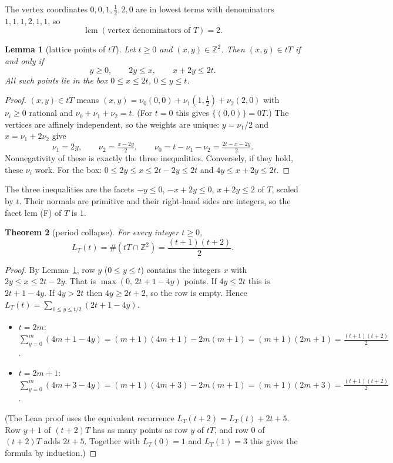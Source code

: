 \documentclass[11pt]{article}
\newtheorem{theorem}{Theorem}
\newtheorem{lemma}[theorem]{Lemma}
\theoremstyle{definition}
\theoremstyle{remark}
\newcommand{\Z}{\mathbb Z}
\newcommand{\lcm}{\operatorname{lcm}}
\begin{document}
The vertex coordinates $0,0,1,\frac12,2,0$ are in lowest terms with denominators
$1,1,1,2,1,1$, so
\[
  \lcm(\text{vertex denominators of } T)=2 .
\]

\begin{lemma}[lattice points of $tT$]\label{lem:HT}
Let $t\ge0$ and $(x,y)\in\Z^2$. Then $(x,y)\in tT$ if and only if
\[
  y\ge0,\qquad 2y\le x,\qquad x+2y\le 2t .
\]
All such points lie in the box $0\le x\le 2t$, $0\le y\le t$.
\end{lemma}

\begin{proof}
$(x,y)\in tT$ means $(x,y)=\nu_0(0,0)+\nu_1(1,\frac12)+\nu_2(2,0)$ with $\nu_i\ge0$ rational and
$\nu_0+\nu_1+\nu_2=t$. (For $t=0$ this gives $\{(0,0)\}=0T$.) The vertices are affinely independent, so
the weights are unique: $y=\nu_1/2$ and $x=\nu_1+2\nu_2$ give
\[
  \nu_1=2y,\qquad \nu_2=\tfrac{x-2y}{2},\qquad \nu_0=t-\nu_1-\nu_2=\tfrac{2t-x-2y}{2}.
\]
Nonnegativity of these is exactly the three inequalities. Conversely, if they hold, these $\nu_i$
work. For the box: $0\le 2y\le x\le 2t-2y\le 2t$ and $4y\le x+2y\le 2t$.
\end{proof}

The three inequalities are the facets $-y\le0$, $-x+2y\le0$, $x+2y\le2$ of $T$, scaled by $t$. Their
normals are primitive and their right-hand sides are integers, so the facet lcm (F) of $T$ is $1$.

\begin{theorem}[period collapse]\label{thm:T}
For every integer $t\ge0$,
\[
  L_T(t)=\#(tT\cap\Z^2)=\frac{(t+1)(t+2)}{2}.
\]
\end{theorem}

\begin{proof}
By Lemma~\ref{lem:HT}, row $y$ ($0\le y\le t$) contains the integers $x$ with $2y\le x\le 2t-2y$.
That is $\max(0,\,2t+1-4y)$ points. If $4y\le 2t$ this is $2t+1-4y$. If $4y>2t$ then $4y\ge 2t+2$, so
the row is empty. Hence $L_T(t)=\sum_{0\le y\le t/2}(2t+1-4y)$.
\begin{itemize}
\item $t=2m$: $\sum_{y=0}^{m}(4m+1-4y)=(m+1)(4m+1)-2m(m+1)=(m+1)(2m+1)=\frac{(t+1)(t+2)}2$.
\item $t=2m+1$: $\sum_{y=0}^{m}(4m+3-4y)=(m+1)(4m+3)-2m(m+1)=(m+1)(2m+3)=\frac{(t+1)(t+2)}2$.
\end{itemize}
(The Lean proof uses the equivalent recurrence $L_T(t+2)=L_T(t)+2t+5$. Row $y+1$ of $(t+2)T$ has as
many points as row $y$ of $tT$, and row $0$ of $(t+2)T$ adds $2t+5$. Together with $L_T(0)=1$ and
$L_T(1)=3$ this gives the formula by induction.)
\end{proof}
\end{document}
